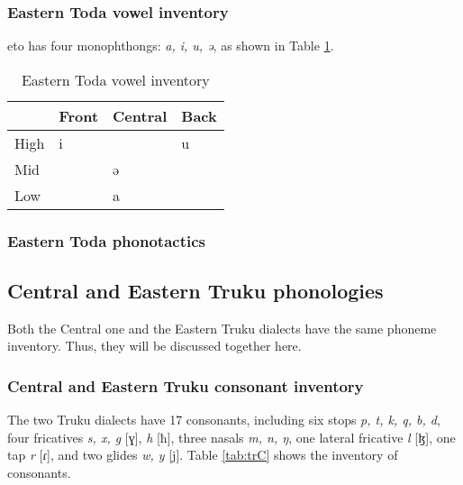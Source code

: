 \lipsum[1-2]

\subsubsection{Eastern Toda vowel inventory}

\acl{eto} has four monophthongs: \textit{a, i, u, ə}, as shown in Table \ref{tab:etoV}.

\begin{table}[!htbp]
\centering
\caption{Eastern Toda vowel inventory}
\label{tab:etoV}
\begin{tabular}{llll}
\hline
     & Front & Central & Back \\ \hline
High &  i    &         &  u   \\
Mid  &       &  ə      &      \\
Low  &       &  a      &      \\ \hline
\end{tabular}
\end{table}

\lipsum[1]

\subsubsection{Eastern Toda phonotactics}
\lipsum[1-3]

\subsection{Central and Eastern Truku phonologies}
Both the Central one and the Eastern Truku dialects have the same phoneme inventory. Thus, they will be discussed together here. 

\subsubsection{Central and Eastern Truku consonant inventory}

The two Truku dialects have 17 consonants, including six stops \textit{p, t, k, q, b, d}, four fricatives \textit{s, x, g} [ɣ], \textit{h} [ħ], three nasals \textit{m, n, ŋ}, one lateral fricative \textit{l} [ɮ], one tap \textit{r} [ɾ], and two glides \textit{w, y} [j]. Table \ref{tab:trC} shows the inventory of consonants.

